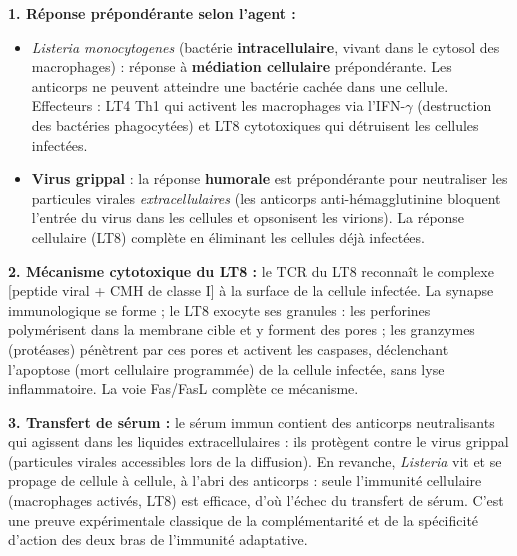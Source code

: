 \documentclass[11pt]{article}
\newcommand{\cle}[1]{{\popxbold\color{popdark}#1}}
\begin{document}
\begin{corrige}
\textbf{1. Réponse prépondérante selon l'agent :}
\begin{itemize}
    \item \emph{Listeria monocytogenes} (bactérie \textbf{intracellulaire}, vivant dans le cytosol des macrophages) : réponse à \textbf{médiation cellulaire} prépondérante. Les anticorps ne peuvent atteindre une bactérie cachée dans une cellule. Effecteurs : LT4 Th1 qui activent les macrophages via l'IFN-$\gamma$ (destruction des bactéries phagocytées) et LT8 cytotoxiques qui détruisent les cellules infectées.
    \item \textbf{Virus grippal} : la réponse \textbf{humorale} est prépondérante pour neutraliser les particules virales \emph{extracellulaires} (les anticorps anti-hémagglutinine bloquent l'entrée du virus dans les cellules et opsonisent les virions). La réponse cellulaire (LT8) complète en éliminant les cellules déjà infectées.
\end{itemize}

\textbf{2. Mécanisme cytotoxique du LT8 :} le TCR du LT8 reconnaît le complexe [peptide viral + CMH de classe I] à la surface de la cellule infectée. La synapse immunologique se forme ; le LT8 exocyte ses granules : les \cle{perforines} polymérisent dans la membrane cible et y forment des pores ; les \cle{granzymes} (protéases) pénètrent par ces pores et activent les caspases, déclenchant l'\cle{apoptose} (mort cellulaire programmée) de la cellule infectée, sans lyse inflammatoire. La voie Fas/FasL complète ce mécanisme.

\textbf{3. Transfert de sérum :} le sérum immun contient des anticorps neutralisants qui agissent dans les liquides extracellulaires : ils protègent contre le virus grippal (particules virales accessibles lors de la diffusion). En revanche, \emph{Listeria} vit et se propage de cellule à cellule, à l'abri des anticorps : seule l'immunité cellulaire (macrophages activés, LT8) est efficace, d'où l'échec du transfert de sérum. C'est une preuve expérimentale classique de la complémentarité et de la spécificité d'action des deux bras de l'immunité adaptative.
\end{corrige}
\end{document}
